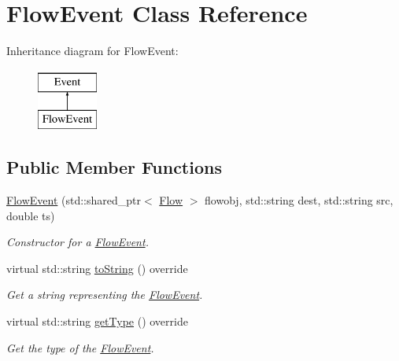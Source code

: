 \hypertarget{classFlowEvent}{\section{\-Flow\-Event \-Class \-Reference}
\label{classFlowEvent}
}
\-Inheritance diagram for \-Flow\-Event\-:\begin{figure}[H]
\begin{center}
\leavevmode
\includegraphics[height=2.000000cm]{classFlowEvent}
\end{center}
\end{figure}
\subsection*{\-Public \-Member \-Functions}
\begin{DoxyCompactItemize}
\item 
\hyperlink{classFlowEvent_a9d97fae76b3d07e6de4db669b95c9d48}{\-Flow\-Event} (std\-::shared\-\_\-ptr$<$ \hyperlink{classFlow}{\-Flow} $>$ flowobj, std\-::string dest, std\-::string src, double ts)
\begin{DoxyCompactList}\small\item\em \-Constructor for a \hyperlink{classFlowEvent}{\-Flow\-Event}. \end{DoxyCompactList}\item 
virtual std\-::string \hyperlink{classFlowEvent_a9e52eec8275fc6639be057b7218d5f6f}{to\-String} () override
\begin{DoxyCompactList}\small\item\em \-Get a string representing the \hyperlink{classFlowEvent}{\-Flow\-Event}. \end{DoxyCompactList}\item 
virtual std\-::string \hyperlink{classFlowEvent_a6712fde91ba4bbe86918315e85dff998}{get\-Type} () override
\begin{DoxyCompactList}\small\item\em \-Get the type of the \hyperlink{classFlowEvent}{\-Flow\-Event}. \end{DoxyCompactList}\end{DoxyCompactItemize}
